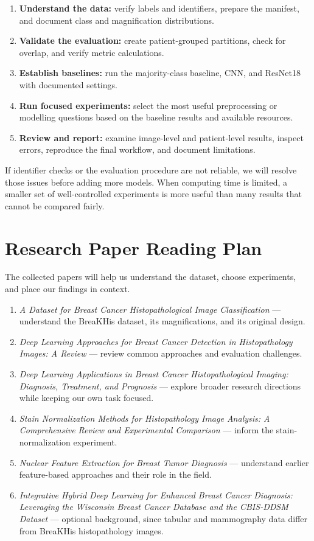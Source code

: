 \documentclass[11pt,a4paper]{article}
\begin{document}
\begin{enumerate}
    \item \textbf{Understand the data:} verify labels and identifiers, prepare the manifest, and document class and magnification distributions.
    \item \textbf{Validate the evaluation:} create patient-grouped partitions, check for overlap, and verify metric calculations.
    \item \textbf{Establish baselines:} run the majority-class baseline, CNN, and ResNet18 with documented settings.
    \item \textbf{Run focused experiments:} select the most useful preprocessing or modelling questions based on the baseline results and available resources.
    \item \textbf{Review and report:} examine image-level and patient-level results, inspect errors, reproduce the final workflow, and document limitations.
\end{enumerate}

If identifier checks or the evaluation procedure are not reliable, we will resolve those issues before adding more models. When computing time is limited, a smaller set of well-controlled experiments is more useful than many results that cannot be compared fairly.

\section{Research Paper Reading Plan}

The collected papers will help us understand the dataset, choose experiments, and place our findings in context.

\begin{enumerate}
    \item \textit{A Dataset for Breast Cancer Histopathological Image Classification} --- understand the BreaKHis dataset, its magnifications, and its original design.
    \item \textit{Deep Learning Approaches for Breast Cancer Detection in Histopathology Images: A Review} --- review common approaches and evaluation challenges.
    \item \textit{Deep Learning Applications in Breast Cancer Histopathological Imaging: Diagnosis, Treatment, and Prognosis} --- explore broader research directions while keeping our own task focused.
    \item \textit{Stain Normalization Methods for Histopathology Image Analysis: A Comprehensive Review and Experimental Comparison} --- inform the stain-normalization experiment.
    \item \textit{Nuclear Feature Extraction for Breast Tumor Diagnosis} --- understand earlier feature-based approaches and their role in the field.
    \item \textit{Integrative Hybrid Deep Learning for Enhanced Breast Cancer Diagnosis: Leveraging the Wisconsin Breast Cancer Database and the CBIS-DDSM Dataset} --- optional background, since tabular and mammography data differ from BreaKHis histopathology images.
\end{enumerate}
\end{document}
